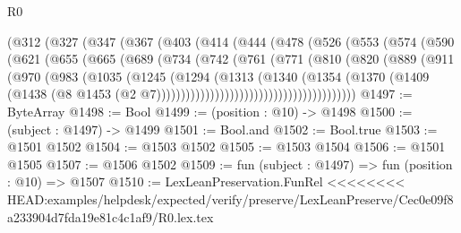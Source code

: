 \begin{lexlean}{R0}
\begin{coremodule}
{{{{{{{{{{{{{{{{{{{{{{{{{{{{{{{{{{{{{{{{{{{{{{{{{{{{{{{{{{{{{{{{{{{{{{{{{            (@312
              (@327
                (@347
                  (@367
                    (@403
                      (@414
                        (@444
                          (@478
                            (@526
                              (@553
                                (@574
                                  (@590
                                    (@621
                                      (@655
                                        (@665
                                          (@689
                                            (@734
                                              (@742
                                                (@761
                                                  (@771
                                                    (@810
                                                      (@820
                                                        (@889
                                                          (@911
                                                            (@970
                                                              (@983
                                                                (@1035
                                                                  (@1245
                                                                    (@1294
                                                                      (@1313
                                                                        (@1340
                                                                          (@1354
                                                                            (@1370
                                                                              (@1409
                                                                                (@1438
                                                                                  (@8
                                                                                    @1453
                                                                                    (@2
                                                                                      @7)))))))))))))))))))))))))))))))))))))))))
@1497 := ByteArray
@1498 := Bool
@1499 := (position : @10) -> @1498
@1500 := (subject : @1497) -> @1499
@1501 := Bool.and
@1502 := Bool.true
@1503 := @1501 @1502
@1504 := @1503 @1502
@1505 := @1503 @1504
@1506 := @1501 @1505
@1507 := @1506 @1502
@1509 := fun (subject : @1497) => fun (position : @10) => @1507
@1510 := LexLeanPreservation.FunRel
<<<<<<<< HEAD:examples/helpdesk/expected/verify/preserve/LexLeanPreserve/Cec0e09f8a233904d7fda19e81c4c1af9/R0.lex.tex
}}}}}}}}}}}}}}}}}}}}}}}}}}}}}}}}}}}}}}}}}}}}}}}}}}}}}}}}}}}}}}}}}}}}}}}}}
\end{coremodule}
\end{lexlean}
